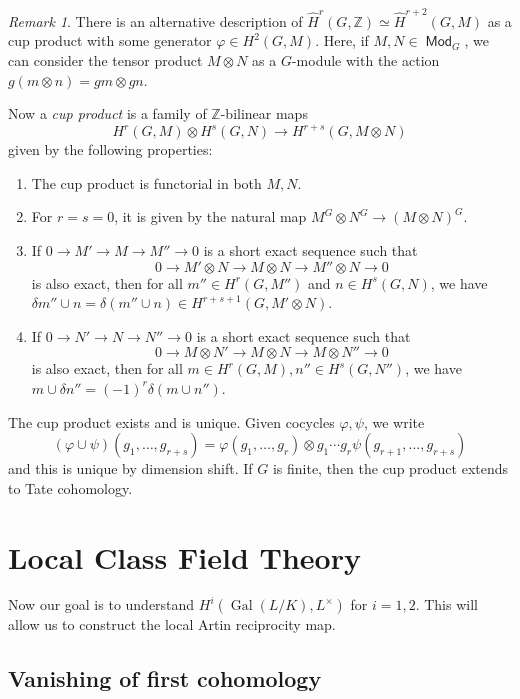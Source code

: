 \documentclass[leqno, openany]{memoir}
\theoremstyle{definition}
\theoremstyle{remark}
\newtheorem{rmk}[thm]{Remark}
\theoremstyle{plain}
\theoremstyle{definition}
\theoremstyle{remark}
\newcommand{\Z}{\mathbb{Z}}
\newcommand{\wh}[1]{\widehat{#1}}
\DeclareMathOperator{\Gal}{Gal}
\DeclareMathOperator{\Mod}{\mathsf{Mod}}
\begin{document}
\begin{rmk}
    There is an alternative description of $\wh{H}^r(G, \Z) \simeq \wh{H}^{r+2}(G, M)$ as a cup product with some generator $\varphi \in H^2(G, M)$. Here, if $M, N \in \Mod_G$, we can consider the tensor product $M \otimes N$ as a $G$-module with the action $g(m \otimes n) = gm \otimes gn$.

    Now a \textit{cup product} is a family of $\Z$-bilinear maps 
    \[ H^r(G, M) \otimes H^s(G, N) \to H^{r+s}(G, M \otimes N) \]
    given by the following properties:
    \begin{enumerate}
        \item The cup product is functorial in both $M, N$.
        \item For $r = s = 0$, it is given by the natural map $M^G \otimes N^G \to {(M \otimes N)}^G$.
        \item If $0 \to M' \to M \to M'' \to 0$ is a short exact sequence such that
            \[ 0 \to M' \otimes N \to M \otimes N \to M'' \otimes N \to 0 \]
            is also exact, then for all $m'' \in H^r(G, M'')$ and $n \in H^s(G, N)$, we have $\delta m'' \cup n = \delta (m'' \cup n) \in H^{r+s+1}(G, M' \otimes N)$.
        \item If $0 \to N' \to N \to N'' \to 0$ is a short exact sequence such that
            \[ 0 \to M \otimes N' \to M \otimes N \to M \otimes N'' \to 0 \]
            is also exact, then for all $m \in H^r(G, M), n'' \in H^s(G, N'')$, we have $m \cup \delta n'' = {(-1)}^r \delta(m \cup n'')$.
    \end{enumerate}
    The cup product exists and is unique. Given cocycles $\varphi, \psi$, we write
    \[ (\varphi \cup \psi) (g_1, \ldots, g_{r+s}) = \varphi(g_1, \ldots, g_r) \otimes g_1 \cdots g_r \psi(g_{r+1}, \ldots, g_{r+s}) \]
    and this is unique by dimension shift. If $G$ is finite, then the cup product extends to Tate cohomology.
\end{rmk}

\chapter{Local Class Field Theory}%
\label{cha:local_class_field_theory}

Now our goal is to understand $H^i(\Gal(L/K), L^{\times})$ for $i = 1,2$. This will allow us to construct the local Artin reciprocity map.

\section{Vanishing of first cohomology}%
\label{sec:vanishing_of_first_cohomology}
\end{document}
